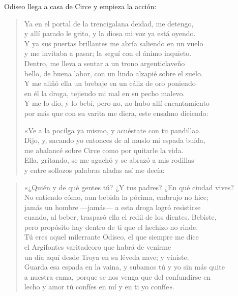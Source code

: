 Odiseo llega a casa de Circe y empieza la acción:

\begin{verse}
Ya en el portal de la trencigalana deidad, me detengo,\\
y allí parado le grito, y la diosa mi voz ya está oyendo.\\
Y ya sus puertas brillantes me abría saliendo en un vuelo\\
y me invitaba a pasar; la seguí con el ánimo inquieto.\\
Dentro, me lleva a sentar a un trono argenticlaveño\\
bello, de buena labor, con un lindo alzapié sobre el suelo.\\
Y me aliñó ella un brebaje en un cáliz de oro poniendo\\
en él la droga, tejiendo mi mal en su pecho malevo.\\
Y me lo dio, y lo bebí, pero no, no hubo allí encantamiento\\
por más que con su varita me diera, este ensalmo diciendo:

«Ve a la pocilga ya mismo, y acuéstate con tu pandilla».\\
Dijo, y, sacando yo entonces de al muslo mi espada buída,\\
me abalancé sobre Circe como por quitarle la vida.\\
Ella, gritando, se me agachó y se abrazó a mis rodillas\\
y entre sollozos palabras aladas así me decía:
\end{verse}

\begin{verse}
«¿Quién y de qué gentes tú? ¿Y tus padres? ¿En qué ciudad vives?\\
No entiendo cómo, aun bebida la pócima, embrujo no hice;\\
jamás un hombre ---jamás--- a esta droga logró resistirse\\
cuando, al beber, traspasó ella el redil de los dientes. Bebiste,\\
pero propósito hay dentro de ti que el hechizo no rinde.\\
Tú eres aquel milerrante Odiseo, el que siempre me dice\\
el Argifontes varitadeoro que habrá de venirme\\
un día aquí desde Troya en su léveda nave; y viniste.\\
Guarda esa espada en la vaina, y subamos tú y yo sin más quite\\
a nuestra cama, porque se nos venga que del confundirse en\\
lecho y amor tú confíes en mí y en ti yo confíe».
\end{verse}


